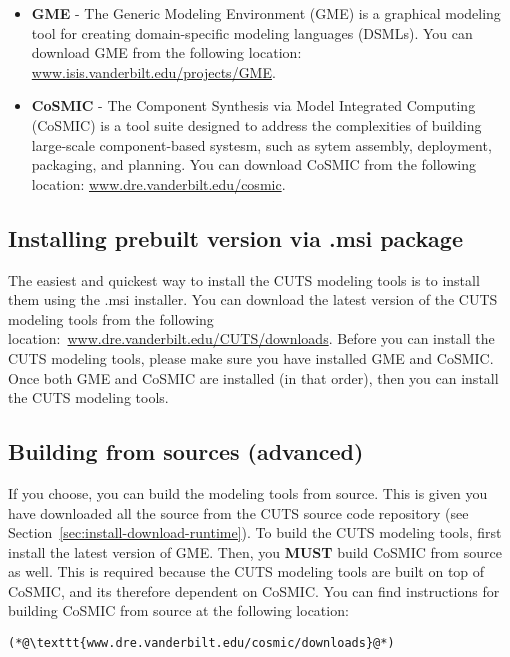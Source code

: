\begin{itemize}
  \item \textbf{GME} - The Generic Modeling Environment (GME) is a graphical
  modeling tool for creating domain-specific modeling languages (DSMLs). You
  can download GME from the following location: \url{www.isis.vanderbilt.edu/projects/GME}.

  \item \textbf{CoSMIC} - The Component Synthesis via Model Integrated 
  Computing (CoSMIC) is a tool suite designed to address the complexities of
  building large-scale component-based systesm, such as sytem assembly, 
  deployment, packaging, and planning. You can download CoSMIC from the following
  location: \url{www.dre.vanderbilt.edu/cosmic}.
\end{itemize}

\subsection{Installing prebuilt version via .msi package}

The easiest and quickest way to install the CUTS modeling tools is to install
them using the .msi installer. You can download the latest version of the 
CUTS modeling tools from the following location:~\url{www.dre.vanderbilt.edu/CUTS/downloads}.
Before you can install the CUTS modeling tools, please make sure you have
installed GME and CoSMIC. Once both GME and CoSMIC are installed (in that
order), then you can install the CUTS modeling tools.

\subsection{Building from sources (advanced)}

If you choose, you can build the modeling tools from source. This is given you
have downloaded all the source from the CUTS source code repository (see 
Section~\ref{sec:install-download-runtime}). To build the CUTS modeling tools,
first install the latest version of GME. Then, you \textbf{MUST} build CoSMIC
from source as well. This is required because the CUTS modeling tools are
built on top of CoSMIC, and its therefore dependent on CoSMIC. You can find
instructions for building CoSMIC from source at the following location:

\begin{lstlisting}
(*@\texttt{www.dre.vanderbilt.edu/cosmic/downloads}@*)
\end{lstlisting}

